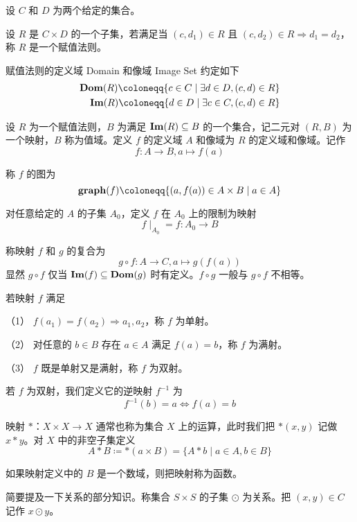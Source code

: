 设 $C$ 和 $D$ 为两个给定的集合。

\begin{definition}[赋值法则]
	设 $R$ 是 $C\times D$ 的一个子集，若满足当 $(c,d_1)\in R$ 且 $(c,d_2)\in R \Rightarrow d_1=d_2$，称 $R$ 是一个赋值法则。
\end{definition}

赋值法则的定义域 Domain 和像域 Image Set 约定如下
\begin{equation*}
	\begin{aligned}
		\dom(R) \coloneqq  \{c\in C \mid \exists d \in D, (c,d) \in R\} \\
		\im(R) \coloneqq  \{d\in D \mid \exists c \in C, (c,d) \in R\}  \\
	\end{aligned}
\end{equation*}

\begin{definition}
	设 $R$ 为一个赋值法则，$B$ 为满足 $\operatorname{\mathbf{Im}}(R) \subseteq B$ 的一个集合，记二元对 $(R,B)$ 为一个映射，$B$ 称为值域。定义 $f$ 的定义域 $A$ 和像域为 $R$ 的定义域和像域。记作
	$$f:A\to B, a\mapsto f(a)$$
\end{definition}

称 $f$ 的图为
$$\graph(f) \coloneqq  \{(a,f(a)) \in A\times B \mid a \in A\}$$

对任意给定的 $A$ 的子集 $A_0$，定义 $f$ 在 $A_0$ 上的限制为映射
$$f \mid_{A_0} = f : A_0 \to B$$

称映射 $f$ 和 $g$ 的复合为
$$g\circ f: A \to C, a \mapsto g(f(a))$$
显然 $g \circ f$ 仅当 $\operatorname{\mathbf{Im}}(f) \subseteq \operatorname{\mathbf{Dom}}(g)$ 时有定义。$f\circ g$ 一般与 $g \circ f$ 不相等。

若映射 $f$ 满足

（1） $f(a_1) = f(a_2) \Rightarrow a_1,a_2$，称 $f$ 为单射。

（2） 对任意的 $b\in B$ 存在 $a\in A$ 满足 $f(a)=b$，称 $f$ 为满射。

（3） $f$ 既是单射又是满射，称 $f$ 为双射。

若 $f$ 为双射，我们定义它的逆映射 $f^{-1}$ 为
$$f^{-1}(b) =  a \Leftrightarrow f(a) = b$$

映射 $\ast$：$X\times X \to X$ 通常也称为集合 $X$ 上的运算，此时我们把 $\ast(x,y)$ 记做 $x \ast y$。对 $X$ 中的非空子集定义
$$A \ast B \coloneqq  \ast(a\times B) = \{A \ast b \mid a \in A, b\in B\}$$

如果映射定义中的 $B$ 是一个数域，则把映射称为函数。

简要提及一下关系的部分知识。称集合 $S\times S$ 的子集 $\odot$ 为关系。把 $(x,y) \in C$ 记作 $x \odot y$。

